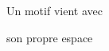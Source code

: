 \documentclass[preview]{standalone}
\begin{document}
\begin{center}
Un motif vient avec
        
son propre espace
\end{center}
\end{document}
